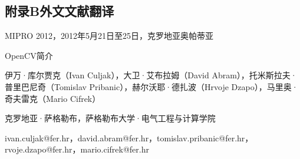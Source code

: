 \documentclass{bjtu-bachelor-thesis}
\begin{document}
\begin{appendices}
\section*{附录B\hspace{1em}外文文献翻译}

MIPRO 2012，2012年5月21日至25日，克罗地亚奥帕蒂亚
\begin{center}
    OpenCV简介\par
伊万·库尔贾克（Ivan Culjak），大卫·艾布拉姆（David Abram），托米斯拉夫·普里巴尼奇（Tomislav Pribanic），赫尔沃耶·德扎波（Hrvoje Dzapo），马里奥·奇夫雷克（Mario Cifrek）\par
克罗地亚·萨格勒布，萨格勒布大学·电气工程与计算学院\par
ivan.culjak@fer.hr，david.abram@fer.hr，tomislav.pribanic@fer.hr，rvoje.dzapo@fer.hr，mario.cifrek@fer.hr\par
\end{center}


\end{appendices}
\end{document}
